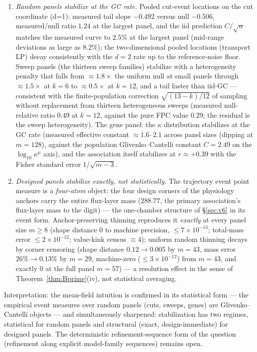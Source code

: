\documentclass[11pt,a4paper]{article}
\theoremstyle{plain}
\theoremstyle{definition}
\theoremstyle{remark}
\newcommand{\kmu}{\kappa^{\mu}}
\begin{document}
\begin{enumerate}[label=(\roman*),leftmargin=2em]
\item \emph{Random panels stabilize at the GC rate.} Pooled cut-event
      locations on the cut coordinate (d=1): measured tail slope
      $-0.492$ versus null $-0.506$, measured/null ratio $1.24$ at
      the largest panel, and the iid prediction $C/\sqrt{n}$ matches
      the measured curve to $2.5\%$ at the largest panel (mid-range
      deviations as large as $8.2\%$); the two-dimensional pooled
      locations (transport LP) decay consistently with the $d=2$ rate
      up to the reference-noise floor. Sweep panels (the thirteen sweep families) stabilize with a heterogeneity penalty that falls
      from $\approx1.8\times$ the uniform null at small panels
      through $\approx1.5\times$ at $k = 6$ to $\approx0.5\times$ at
      $k = 12$, and a tail faster than iid-GC --- consistent with the
      finite-population correction
      $\sqrt{(13-k)/12}$ of sampling without replacement from
      thirteen heterogeneous sweeps (measured null-relative ratio
      $0.49$ at $k = 12$, against the pure FPC value $0.29$; the
      residual is the sweep heterogeneity). The gene panel: the $\kappa$ distribution stabilizes at the GC rate (measured
      effective constant $\approx 1.6$--$2.1$ across panel sizes
      (dipping at $m = 128$), against the population
      Glivenko--Cantelli constant $C = 2.49$
      on the $\log_{10}\kmu$ axis), and the association itself
      stabilizes at $r \approx +0.39$ with the Fisher standard error
      $1/\sqrt{m-3}$.
\item \emph{Designed panels stabilize exactly, not statistically.}
      The trajectory event point measure is a \emph{four-atom} object: the four design corners of the physiology anchors carry the entire flux-layer mass ($288.77$, the primary association's flux-layer mass to the digit) --- the one-chamber structure of \S\ref{sec:v6} in its event form.
      Anchor-preserving thinning reproduces it \emph{exactly} at every
      panel size $m \ge 8$ (shape distance $0$ to machine precision,
      $\le 7 \times 10^{-13}$; total-mass error $\le 2 \times
      10^{-12}$; value-kink census $\equiv 4$); uniform random
      thinning decays by corner censoring (shape distance
      $0.12 \to 0.005$ by $m = 43$, mass error $26\% \to 0.13\%$ by
      $m = 29$, machine-zero ($\le 3 \times 10^{-12}$) from
      $m = 43$, and exactly $0$ at the full panel $m = 57$) --- a
      resolution effect in the sense of Theorem~\ref{thm:Bprime}(iv),
      not statistical averaging.
\end{enumerate}
Interpretation: the mean-field intuition is confirmed in its
statistical form --- the empirical event measures over random panels
(cuts, sweeps, genes) are Glivenko--Cantelli objects --- and
simultaneously sharpened: stabilization has two regimes, statistical
for random panels and structural (exact, design-immediate) for
designed panels. The deterministic refinement-sequence form of the
question (refinement along explicit model-family sequences) remains open.
\end{document}
